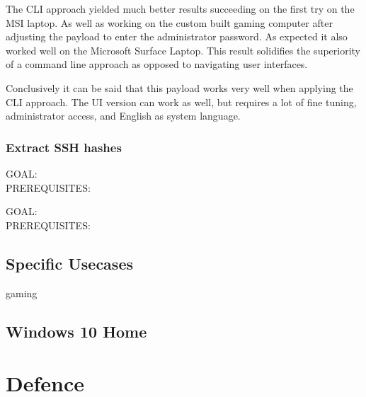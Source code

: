 The CLI approach yielded much better results succeeding on the first try on the MSI laptop. As well as working on the custom built gaming computer after adjusting the payload to enter the administrator password. As expected it also worked well on the Microsoft Surface Laptop. This result solidifies the superiority of a command line approach as opposed to navigating user interfaces. 


Conclusively it can be said that this payload works very well when applying the CLI approach. The UI version can work as well, but requires a lot of fine tuning, administrator access, and English as system language. 



\subsubsection{Extract SSH hashes}

GOAL:\\
PREREQUISITES:



GOAL:\\
PREREQUISITES:


\subsection{Specific Usecases}

gaming

\subsection{Windows 10 Home}




\section{Defence}
